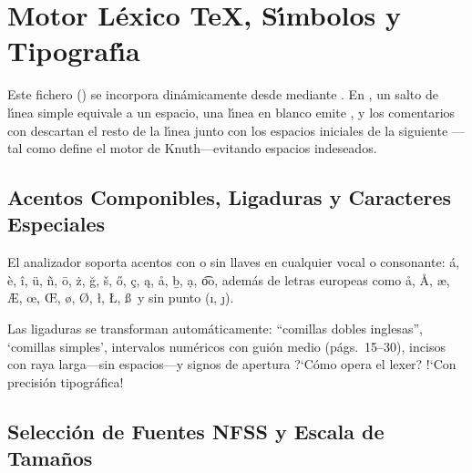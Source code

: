 
\section{Motor L\'exico \TeX{}, S\'{\i}mbolos y Tipograf\'{\i}a}\label{sec:lexico}

Este fichero () se incorpora din\'amicamente desde  mediante .
En \LaTeXe{}, un salto de l\'{\i}nea simple equivale a un espacio, una l\'{\i}nea en blanco emite , y los comentarios con \codigo{\%} descartan el resto de la l\'{\i}nea junto con los espacios iniciales de la siguiente%
---tal como define el motor de Knuth---evitando espacios indeseados.

\subsection{Acentos Componibles, Ligaduras y Caracteres Especiales}

El analizador soporta acentos con o sin llaves en cualquier vocal o consonante:
\'a, \`e, \^i, \"u, \~n, \=o, \.z, \u{g}, \v{s}, \H{o}, \c{c}, \k{a}, \r{a}, \b{b}, \d{a}, \t{oo},
adem\'as de letras europeas como \aa, \AA, \ae, \AE, \oe, \OE, \o, \O, \l, \L, \ss\ y sin punto (\i, \j).

Las ligaduras se transforman autom\'aticamente: ``comillas dobles inglesas'', `comillas simples',
intervalos num\'ericos con gui\'on medio (p\'ags.~15--30), incisos con raya larga---sin espacios---y signos de apertura ?`C\'omo opera el lexer? !`Con precisi\'on tipogr\'afica!


\subsection{Selecci\'on de Fuentes NFSS y Escala de Tama\~nos}

